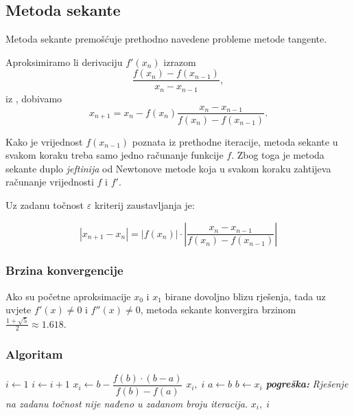 \subsection{Metoda sekante}

Metoda sekante premošćuje prethodno navedene probleme metode tangente.

Aproksimiramo li derivaciju $f'(x_n)$ izrazom
$$
\dfrac{f(x_n)-f(x_{n-1})}{x_n - x_{n-1}},
$$
iz , dobivamo
$$
x_{n+1} = x_n - f(x_n)\dfrac{x_n-x_{n-1}}{f(x_n)-f(x_{n-1})}.
$$

Kako je vrijednost $f(x_{n-1})$ poznata iz prethodne iteracije, metoda sekante u
svakom koraku treba samo jedno računanje funkcije $f$. Zbog toga je metoda
sekante duplo \textit{jeftinija} od Newtonove metode koja u svakom koraku
zahtijeva računanje vrijednosti $f$ i $f'$.

Uz zadanu točnost $\varepsilon$ kriterij zaustavljanja je:

$$
|x_{n+1}-x_n| = |f(x_n)|\cdot\left|\frac{x_n-x_{n-1}}{f(x_n)-f(x_{n-1})}\right|
$$

\subsubsection{Brzina konvergencije}

Ako su početne aproksimacije $x_0$ i $x_1$ birane dovoljno blizu rješenja, tada
uz uvjete $f'(x)\neq 0$ i $f''(x)\neq 0$, metoda sekante konvergira brzinom
$\frac{1+\sqrt{5}}{2}\approx 1.618$.

\subsubsection{Algoritam}

\begin{algorithmic}
    \State $i \gets 1$
        \State $i \gets i + 1$
        \State $x_i \gets b - \dfrac{f(b) \cdot (b - a)}{f(b) - f(a)}$
            \State \Return $x_i,\;i$ 
        \Else
            \State $a \gets b$
            \State $b \gets x_i$
        \EndIf
            \State \textit{\textbf{pogreška:}} \textit{Rješenje na zadanu točnost nije nađeno u zadanom broju iteracija.}
        \EndIf
    \EndWhile
    \State \Return $x_i,\;i$
\EndFunction
\end{algorithmic}
